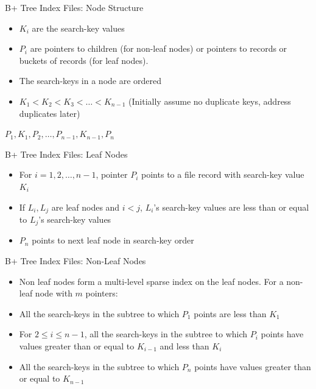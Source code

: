\documentclass[aspectratio=169, xcolor=dvipsnames]{beamer}
\begin{document}
\begin{frame}{B+ Tree Index Files: Node Structure}
    \begin{itemize}[<+->]
        \item $K_i$ are the search-key values
        \item $P_i$ are pointers to children (for non-leaf nodes) or pointers to records or buckets of records (for leaf nodes).
        \item The search-keys in a node are ordered
        \item $K_1 < K_2 < K_3 < \dots < K_{n-1}$ (Initially assume no duplicate keys, address duplicates later)
    \end{itemize}
    \begin{center}
        $P_1, K_1, P_2, \dots, P_{n-1}, K_{n-1}, P_n$
    \end{center}
\end{frame}

\begin{frame}{B+ Tree Index Files: Leaf Nodes}
    \begin{itemize}[<+->]
        \item For $i = 1, 2, \dots, n-1$, pointer $P_i$ points to a file record with search-key value $K_i$
        \item If $L_i, L_j$ are leaf nodes and $i < j$, $L_i$'s search-key values are less than or equal to $L_j$'s search-key values
        \item $P_n$ points to next leaf node in search-key order
    \end{itemize}
\end{frame}

\begin{frame}{B+ Tree Index Files: Non-Leaf Nodes}
    \begin{itemize}[<+->]
        \item Non leaf nodes form a multi-level sparse index on the leaf nodes. For a non-leaf node with $m$ pointers:
        \item All the search-keys in the subtree to which $P_1$ points are less than $K_1$
        \item For $2 \le i \le n-1$, all the search-keys in the subtree to which $P_i$ points have values greater than or equal to $K_{i-1}$ and less than $K_i$
        \item All the search-keys in the subtree to which $P_n$ points have values greater than or equal to $K_{n-1}$
    \end{itemize}
\end{frame}
\end{document}
